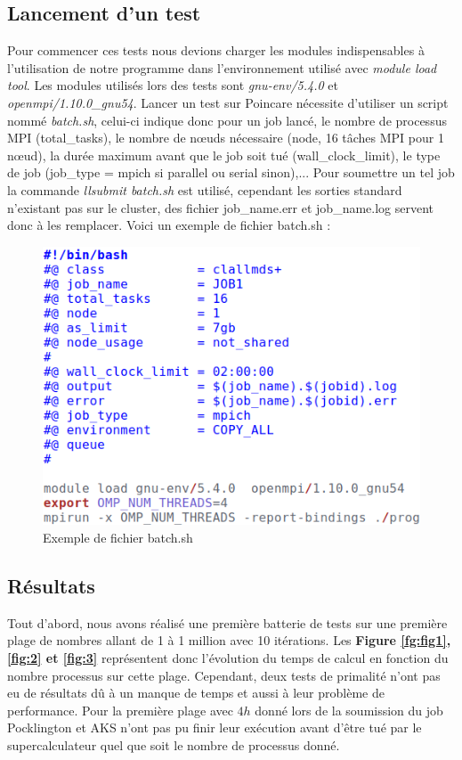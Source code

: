 		\subsection{Lancement d'un test}
Pour commencer ces tests nous devions charger les modules indispensables à l'utilisation de notre programme dans l’environnement utilisé avec  \textit{module load tool}. Les modules utilisés lors des tests sont \textit{gnu-env/5.4.0} et \textit{openmpi/1.10.0\_gnu54}. Lancer un test sur Poincare nécessite d'utiliser un script nommé \textit{batch.sh}, celui-ci indique donc pour un job lancé, le nombre de processus MPI (total\_tasks), le nombre de nœuds nécessaire (node, 16 tâches MPI pour 1 nœud), la durée maximum avant que le job soit tué (wall\_clock\_limit), le type de job (job\_type = mpich si parallel ou serial sinon),... Pour soumettre un tel job la commande \textit{llsubmit batch.sh} est utilisé, cependant les sorties standard n'existant pas sur le cluster, des fichier job\_name.err et job\_name.log servent donc à les remplacer. Voici un exemple de fichier batch.sh :\\
	 \begin{figure}[!ht]	
		\begin{center}\includegraphics[scale=0.6]{batch.png}\end{center}
		\caption{Exemple de fichier batch.sh}
		\label{fg:bat}
\end{figure}
		\subsection{Résultats}
	
Tout d'abord, nous avons réalisé une première batterie de tests sur une première plage de nombres allant de 1 à 1 million avec 10 itérations. Les \textbf{Figure \ref{fg:fig1}, \ref{fig:2} et \ref{fig:3}} représentent donc l'évolution du temps de calcul en fonction du nombre processus sur cette plage. Cependant, deux tests de primalité n'ont pas eu de résultats dû à un manque de temps et aussi à leur problème de performance. Pour la première plage avec $4h$ donné lors de la soumission du job  Pocklington et AKS n'ont pas pu finir leur exécution avant d'être tué par le supercalculateur quel que soit le nombre de processus donné. 
		

